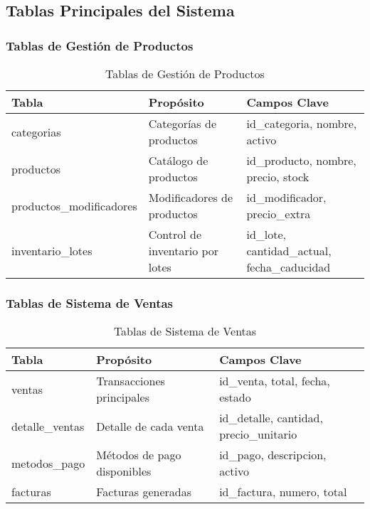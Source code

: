\documentclass[12pt,a4paper]{article}
\begin{document}
\subsection{Tablas Principales del Sistema}

\subsubsection{Tablas de Gestión de Productos}
\begin{table}[H]
\centering
\begin{tabular}{@{}lll@{}}
\toprule
\textbf{Tabla} & \textbf{Propósito} & \textbf{Campos Clave} \\
\midrule
categorias & Categorías de productos & id\_categoria, nombre, activo \\
productos & Catálogo de productos & id\_producto, nombre, precio, stock \\
productos\_modificadores & Modificadores de productos & id\_modificador, precio\_extra \\
inventario\_lotes & Control de inventario por lotes & id\_lote, cantidad\_actual, fecha\_caducidad \\
\bottomrule
\end{tabular}
\caption{Tablas de Gestión de Productos}
\end{table}

\subsubsection{Tablas de Sistema de Ventas}
\begin{table}[H]
\centering
\begin{tabular}{@{}lll@{}}
\toprule
\textbf{Tabla} & \textbf{Propósito} & \textbf{Campos Clave} \\
\midrule
ventas & Transacciones principales & id\_venta, total, fecha, estado \\
detalle\_ventas & Detalle de cada venta & id\_detalle, cantidad, precio\_unitario \\
metodos\_pago & Métodos de pago disponibles & id\_pago, descripcion, activo \\
facturas & Facturas generadas & id\_factura, numero, total \\
\bottomrule
\end{tabular}
\caption{Tablas de Sistema de Ventas}
\end{table}
\end{document}

